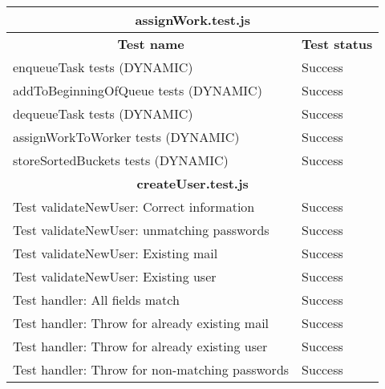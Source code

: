 
\begin{table}[H]
    \centering
    \begin{tabular}{|p{13cm}|l|}
    \hline
        \multicolumn{2}{|c|}{\textbf{assignWork.test.js}} \\ \hline
        \multicolumn{1}{|c|}{\textbf{Test name}} & \textbf{Test status} \\ 
        \hline
        enqueueTask tests (DYNAMIC) & Success \\ \hline
        addToBeginningOfQueue tests (DYNAMIC) & Success\\ \hline
        dequeueTask tests (DYNAMIC) & Success\\ \hline
        assignWorkToWorker tests (DYNAMIC) & Success\\ \hline
        storeSortedBuckets tests (DYNAMIC) & Success\\ \hline
        \multicolumn{2}{|c|}{\textbf{createUser.test.js}}\\ \hline
        Test validateNewUser: Correct information & Success\\ \hline
        Test validateNewUser: unmatching passwords & Success\\ \hline
        Test validateNewUser: Existing mail & Success\\ \hline
        Test validateNewUser: Existing user & Success\\ \hline
        Test handler: All fields match & Success\\ \hline
        Test handler: Throw for already existing mail & Success\\ \hline
        Test handler: Throw for already existing user & Success\\ \hline
        Test handler: Throw for non-matching passwords & Success\\ \hline
    \end{tabular}
\end{table}
